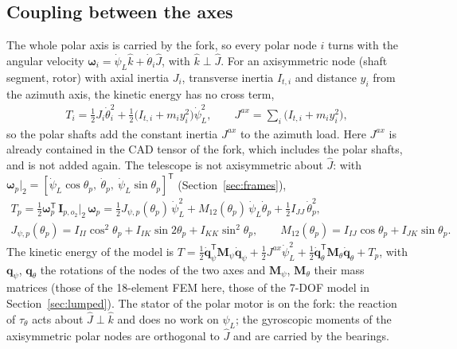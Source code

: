 \documentclass[10pt,a4paper]{article}
\numberwithin{equation}{section}
\begin{document}
\subsection{Coupling between the axes}\label{subsec:coupling}
The whole polar axis is carried by the fork, so every polar node $i$ turns with the angular velocity $\boldsymbol\omega_i = \dot\psi_L\hat k + \dot\theta_i\hat J$, with $\hat k\perp\hat J$. For an axisymmetric node (shaft segment, rotor) with axial inertia $J_i$, transverse inertia $I_{t,i}$ and distance $y_i$ from the azimuth axis, the kinetic energy has no cross term,
\begin{gather}
T_i = \tfrac12 J_i\dot\theta_i^2 + \tfrac12\bigl(I_{t,i} + m_i y_i^2\bigr)\dot\psi_L^2,\qquad J^{ax} = \sum_i\bigl(I_{t,i} + m_i y_i^2\bigr),
\end{gather}
so the polar shafts add the constant inertia $J^{ax}$ to the azimuth load. Here $J^{ax}$ is already contained in the CAD tensor of the fork, which includes the polar shafts, and is not added again. The telescope is not axisymmetric about $\hat J$: with $\boldsymbol\omega_p\big|_2 = [\dot\psi_L\cos\theta_p,\ \dot\theta_p,\ \dot\psi_L\sin\theta_p]^{\mathsf T}$ (Section~\ref{sec:frames}),
\begin{gather}
T_p = \tfrac12\boldsymbol\omega_p^{\mathsf T}\,\mathbf I_{p,o_2}\big|_2\,\boldsymbol\omega_p = \tfrac12 J_{\psi,p}(\theta_p)\,\dot\psi_L^2 + M_{12}(\theta_p)\,\dot\psi_L\dot\theta_p + \tfrac12 I_{JJ}\,\dot\theta_p^2,\\
J_{\psi,p}(\theta_p) = I_{II}\cos^2\theta_p + I_{IK}\sin 2\theta_p + I_{KK}\sin^2\theta_p,\qquad M_{12}(\theta_p) = I_{IJ}\cos\theta_p + I_{JK}\sin\theta_p .
\end{gather}
The kinetic energy of the model is $T = \tfrac12\dot{\mathbf q}_\psi^{\mathsf T}\mathbf M_\psi\dot{\mathbf q}_\psi + \tfrac12 J^{ax}\dot\psi_L^2 + \tfrac12\dot{\mathbf q}_\theta^{\mathsf T}\mathbf M_\theta\dot{\mathbf q}_\theta + T_p$, with $\mathbf q_\psi$, $\mathbf q_\theta$ the rotations of the nodes of the two axes and $\mathbf M_\psi$, $\mathbf M_\theta$ their mass matrices (those of the 18-element FEM here, those of the 7-DOF model in Section~\ref{sec:lumped}). The stator of the polar motor is on the fork: the reaction of $\tau_\theta$ acts about $\hat J\perp\hat k$ and does no work on $\psi_L$; the gyroscopic moments of the axisymmetric polar nodes are orthogonal to $\hat J$ and are carried by the bearings.
\end{document}
